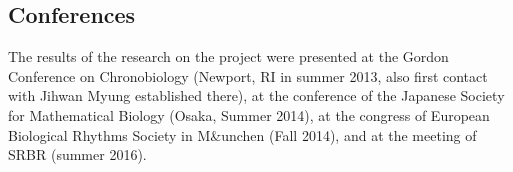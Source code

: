 \documentclass[a4paper]{article}
\begin{document}
\subsection{Conferences}
The results of the research on the project were presented at the
Gordon Conference on Chronobiology (Newport, RI in summer 2013, also
first contact with Jihwan Myung established there), at the conference
of the Japanese Society for Mathematical Biology (Osaka, Summer 2014),
at the congress of European Biological Rhythms Society in M\&unchen
(Fall 2014), and at the meeting of SRBR (summer 2016).



\end{document}
